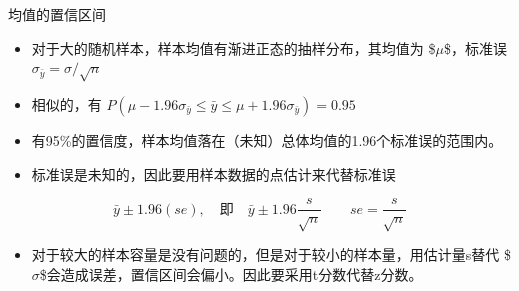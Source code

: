 \documentclass[presentation]{beamer}
\begin{document}
\begin{frame}[label={sec:orgfc068c7}]{均值的置信区间}
\begin{itemize}
\item 对于大的随机样本，样本均值有渐进正态的抽样分布，其均值为 \$\(\mu\)\$，标准误 \(\sigma_{\bar y}=\sigma / \sqrt n\)

\item 相似的，有 \(P(\mu-1.96\sigma_{\bar y} \leq \bar{y} \leq \mu+1.96\sigma_{\bar y})=0.95\)

\item 有95\%的置信度，样本均值落在（未知）总体均值的1.96个标准误的范围内。

\item 标准误是未知的，因此要用样本数据的点估计来代替标准误
\end{itemize}

$$\bar y \pm 1.96(se), \quad 即 \quad \bar y \pm 1.96\frac{s}{\sqrt n} \qquad se=\frac{s}{\sqrt n}$$

\begin{itemize}
\item 对于较大的样本容量是没有问题的，但是对于较小的样本量，用估计量s替代   \$\(\sigma\)\$会造成误差，置信区间会偏小。因此要采用t分数代替z分数。
\end{itemize}
\end{frame}
\end{document}
